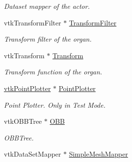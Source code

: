 \begin{DoxyCompactItemize}
\begin{DoxyCompactList}\small\item\em Dataset mapper of the actor. \item\end{DoxyCompactList}\item 
\hypertarget{classvtkOrgan_afc74cfa11894a2ac88f8b79545ce0a5d}{
vtkTransformFilter $\ast$ \hyperlink{classvtkOrgan_afc74cfa11894a2ac88f8b79545ce0a5d}{TransformFilter}}
\label{classvtkOrgan_afc74cfa11894a2ac88f8b79545ce0a5d}

\begin{DoxyCompactList}\small\item\em Transform filter of the organ. \item\end{DoxyCompactList}\item 
\hypertarget{classvtkOrgan_aaea6ee1089523e2d8b8bf40b5db1ea6a}{
vtkTransform $\ast$ \hyperlink{classvtkOrgan_aaea6ee1089523e2d8b8bf40b5db1ea6a}{Transform}}
\label{classvtkOrgan_aaea6ee1089523e2d8b8bf40b5db1ea6a}

\begin{DoxyCompactList}\small\item\em Transform function of the organ. \item\end{DoxyCompactList}\item 
\hypertarget{classvtkOrgan_afbed98f1599b0eef86df3cf9163d319c}{
\hyperlink{classvtkPointPlotter}{vtkPointPlotter} $\ast$ \hyperlink{classvtkOrgan_afbed98f1599b0eef86df3cf9163d319c}{PointPlotter}}
\label{classvtkOrgan_afbed98f1599b0eef86df3cf9163d319c}

\begin{DoxyCompactList}\small\item\em Point Plotter. Only in Test Mode. \item\end{DoxyCompactList}\item 
\hypertarget{classvtkOrgan_ad8533a0f9af0a0dc5bee86e19e6ee2d8}{
vtkOBBTree $\ast$ \hyperlink{classvtkOrgan_ad8533a0f9af0a0dc5bee86e19e6ee2d8}{OBB}}
\label{classvtkOrgan_ad8533a0f9af0a0dc5bee86e19e6ee2d8}

\begin{DoxyCompactList}\small\item\em OBBTree. \item\end{DoxyCompactList}\item 
\hypertarget{classvtkOrgan_a7e81f7828374ebd3d4799defdaaed87a}{
vtkDataSetMapper $\ast$ \hyperlink{classvtkOrgan_a7e81f7828374ebd3d4799defdaaed87a}{SimpleMeshMapper}}
\label{classvtkOrgan_a7e81f7828374ebd3d4799defdaaed87a}


\end{DoxyCompactItemize}
